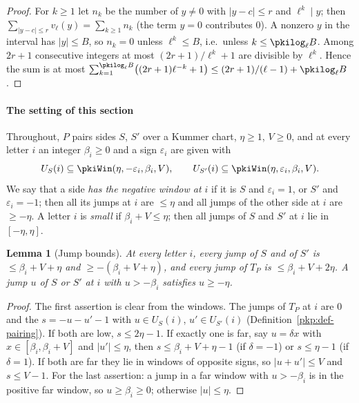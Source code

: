 \documentclass[10pt]{amsart}
\newtheorem{lemma}[theorem]{Lemma}
\theoremstyle{definition}
\theoremstyle{remark}
\begin{document}
\begin{proof}
For $k\ge1$ let $n_k$ be the number of $y\neq0$ with $|y-c|\le r$ and $\ell^k\mid y$; then
$\sum_{|y-c|\le r}v_\ell(y)=\sum_{k\ge1}n_k$ (the term $y=0$ contributes $0$). A nonzero $y$ in the
interval has $|y|\le B$, so $n_k=0$ unless $\ell^k\le B$, i.e.\ unless $k\le\pkilog_\ell B$. Among
$2r+1$ consecutive integers at most $(2r+1)/\ell^k+1$ are divisible by $\ell^k$. Hence the sum is at
most $\sum_{k=1}^{\pkilog_\ell B}\bigl((2r+1)\ell^{-k}+1\bigr)\le(2r+1)/(\ell-1)+\pkilog_\ell B$.
\end{proof}

\paragraph*{The setting of this section}

Throughout, $P$ pairs sides $S$, $S'$ over a Kummer chart, $\eta\ge1$, $V\ge0$, and at every letter
$i$ an integer $\beta_i\ge0$ and a sign $\varepsilon_i$ are given with
\begin{equation}\label{pkd:eq-win}
U_S(i)\subseteq\pkiWin(\eta,-\varepsilon_i,\beta_i,V),\qquad
U_{S'}(i)\subseteq\pkiWin(\eta,\varepsilon_i,\beta_i,V).
\end{equation}
We say that a side \emph{has the negative window at $i$} if it is $S$ and $\varepsilon_i=1$, or $S'$
and $\varepsilon_i=-1$; then all its jumps at $i$ are $\le\eta$ and all jumps of the other side at
$i$ are $\ge-\eta$. A letter $i$ is \emph{small} if $\beta_i+V\le\eta$; then all jumps of $S$ and $S'$
at $i$ lie in $[-\eta,\eta]$.

\begin{lemma}[Jump bounds]\label{pkd:jumps}
At every letter $i$, every jump of $S$ and of $S'$ is $\le\beta_i+V+\eta$ and $\ge-(\beta_i+V+\eta)$,
and every jump of $T_P$ is $\le\beta_i+V+2\eta$. A jump $u$ of $S$ or $S'$ at $i$ with
$u>-\beta_i$ satisfies $u\ge-\eta$.
\end{lemma}

\begin{proof}
The first assertion is clear from the windows. The jumps of $T_P$ at $i$ are $0$ and the
$s=-u-u'-1$ with $u\in U_S(i)$, $u'\in U_{S'}(i)$ (Definition~\ref{pkp:def-pairing}). If both are low,
$s\le2\eta-1$. If exactly one is far, say $u=\delta x$ with $x\in[\beta_i,\beta_i+V]$ and $|u'|\le\eta$,
then $s\le\beta_i+V+\eta-1$ (if $\delta=-1$) or $s\le\eta-1$ (if $\delta=1$). If both are far they lie in
windows of opposite signs, so $|u+u'|\le V$ and $s\le V-1$. For the last assertion: a jump in a far
window with $u>-\beta_i$ is in the positive far window, so $u\ge\beta_i\ge0$; otherwise $|u|\le\eta$.
\end{proof}
\end{document}
